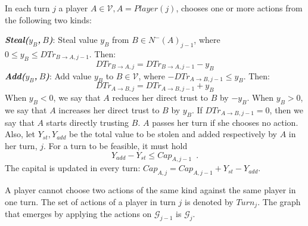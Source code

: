 \begin{definition}[Turns]
  In each turn $j$ a player $A \in \mathcal{V}, A = Player\left(j\right)$, chooses one or more actions from the following two
  kinds:

  \noindent \textit{\textbf{Steal($y_B$,$\:B$)}}: Steal value $y_B$ from $B \in N^{-}\left(A\right)_{j-1}$, where
  $0 \leq y_B \leq DTr_{B \rightarrow A, j-1}$. Then:
  \begin{equation*}
     DTr_{B \rightarrow A, j} = DTr_{B \rightarrow A, j-1} - y_B
  \end{equation*}
  \noindent \textit{\textbf{Add($y_B$,$\:B$)}}:
  Add value $y_B$ to $B \in \mathcal{V}$, where $-DTr_{A \rightarrow B, j-1} \leq y_B$. Then:
  \begin{equation*}
     DTr_{A \rightarrow B, j} = DTr_{A \rightarrow B, j-1} + y_B
  \end{equation*}
  When $y_B < 0$, we say that $A$ reduces her direct trust to $B$ by $-y_B$. When $y_B > 0$, we say that $A$ increases her
  direct trust to $B$ by $y_B$. If $DTr_{A \rightarrow B, j-1} = 0$, then we say that $A$ starts directly trusting $B$.
  $A$ passes her turn if she chooses no action. Also, let $Y_{st}, Y_{add}$ be the
  total value to be stolen and added respectively by $A$ in her turn, $j$. For a turn to be feasible, it must hold
  \begin{equation}
     Y_{add} - Y_{st} \leq Cap_{A, j-1} \enspace.
  \end{equation}
  The capital is updated in every turn: $Cap_{A, j} = Cap_{A, j-1} + Y_{st} - Y_{add}$.

  A player cannot choose two actions of the same kind against the same player in one turn.
  The set of actions of a player in turn $j$ is denoted by $Turn_j$. The graph that emerges by applying
  the actions on $\mathcal{G}_{j-1}$ is $\mathcal{G}_j$.
\end{definition}
